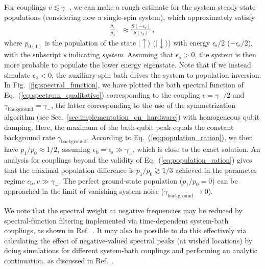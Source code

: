 \documentclass[twocolumn,amsmath,amssymb,pra]{revtex4-2}
\begin{document}
For couplings $v\lesssim \gamma_-$,
we can make a rough estimate for the system steady-state populations
(considering now a single-spin system), which approximately satisfy
\begin{align}\label{eq:population_ration}
\frac{p_1}{p_0} &\approx \frac{S(-\epsilon_\textrm{s})}{S(\epsilon_\textrm{s})} \, ,
\end{align}
where $p_{0(1)}$ is the population of the state $\vert \uparrow\rangle$ ($\vert \downarrow\rangle$) with energy $\epsilon_{\textrm{s}}/2$
($-\epsilon_{\textrm{s}}/2$), with the subscript \textit{s} indicating \textit{system}.
Assuming that $\epsilon_{\textrm{b}}>0$,
the system is then more probable to populate the lower energy eigenstate.
Note that if we instead simulate $\epsilon_{\textrm{b}}<0$, the auxiliary-spin bath drives the system to population inversion.
In Fig.~\ref{fig:spectral_function}, we have plotted the bath spectral function of Eq.~(\ref{eq:spectrum_qualitative})
corresponding to the coupling $v= \gamma_-/2$ and $\gamma_\textrm{background}=\gamma_-$,
the latter corresponding to the use of the symmetrization algorithm
(see Sec.~\ref{sec:implementation_on_hardware}) with homogeneous qubit damping.
Here, the maximum of the bath-qubit peak equals the constant background rate $\gamma_\textrm{background}$.
According to Eq.~(\ref{eq:population_ration}),
we then have $p_1/p_0\approx 1/2$, assuming $\epsilon_\textrm{b}=\epsilon_\textrm{s}\gg \gamma_-$,
which is close to the exact solution.
An analysis for couplings beyond the validity of  Eq.~(\ref{eq:population_ration})
gives that the maximal population difference is $p_1/p_0 \gtrsim 1/3$ 
achieved in the parameter regime $\epsilon_\textrm{b},v\gg \gamma_-$.
The perfect ground-state population ($p_1/p_0=0$)
can be approached in the limit of vanishing system noise ($\gamma_\textrm{background}\rightarrow 0$).

We note that the spectral weight at negative frequencies may be reduced by
spectral-function filtering implemented via time-dependent system-bath couplings, as shown in Ref.~\cite{Lloyd2024}.
It may also be possible to do this effectively via calculating the effect of negative-valued spectral peaks (at wished locations)
by doing simulations for different system-bath couplings and performing an analytic continuation, as discussed in Ref.~\cite{Lambert2024}.
\end{document}
